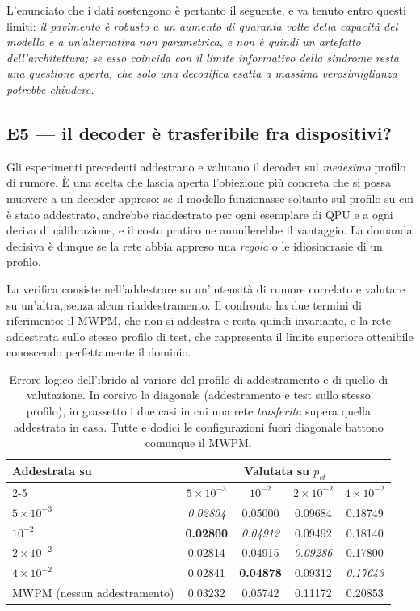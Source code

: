L'enunciato che i dati sostengono è pertanto il seguente, e va tenuto entro questi limiti: \emph{il pavimento è robusto a un aumento di quaranta volte della capacità del modello e a un'alternativa non parametrica, e non è quindi un artefatto dell'architettura; se esso coincida con il limite informativo della sindrome resta una questione aperta, che solo una decodifica esatta a massima verosimiglianza potrebbe chiudere.}

\subsection{E5 --- il decoder è trasferibile fra dispositivi?}
\label{subsec:neural_generalizzazione}

Gli esperimenti precedenti addestrano e valutano il decoder sul \emph{medesimo} profilo di rumore. È una scelta che lascia aperta l'obiezione più concreta che si possa muovere a un decoder appreso: se il modello funzionasse soltanto sul profilo su cui è stato addestrato, andrebbe riaddestrato per ogni esemplare di \ac{QPU} e a ogni deriva di calibrazione, e il costo pratico ne annullerebbe il vantaggio. La domanda decisiva è dunque se la rete abbia appreso una \emph{regola} o le idiosincrasie di un profilo.

La verifica consiste nell'addestrare su un'intensità di rumore correlato e valutare su un'altra, senza alcun riaddestramento. Il confronto ha due termini di riferimento: il \ac{MWPM}, che non si addestra e resta quindi invariante, e la rete addestrata sullo stesso profilo di test, che rappresenta il limite superiore ottenibile conoscendo perfettamente il dominio.

\begin{table}[H]
\centering
\small
\begin{tabular}{lcccc}
\toprule
\textbf{Addestrata su} & \multicolumn{4}{c}{\textbf{Valutata su} $p_{ct}$} \\
\cmidrule(lr){2-5}
 & $5\times10^{-3}$ & $10^{-2}$ & $2\times10^{-2}$ & $4\times10^{-2}$ \\
\midrule
$5\times10^{-3}$ & \textit{0.02804} & 0.05000 & 0.09684 & 0.18749 \\
$10^{-2}$        & \textbf{0.02800} & \textit{0.04912} & 0.09492 & 0.18140 \\
$2\times10^{-2}$ & 0.02814 & 0.04915 & \textit{0.09286} & 0.17800 \\
$4\times10^{-2}$ & 0.02841 & \textbf{0.04878} & 0.09312 & \textit{0.17643} \\
\midrule
\ac{MWPM} (nessun addestramento) & 0.03232 & 0.05742 & 0.11172 & 0.20853 \\
\bottomrule
\end{tabular}
\caption[Trasferibilità del decoder appreso fra profili di rumore]{Errore logico dell'ibrido al variare del profilo di addestramento e di quello di valutazione. In corsivo la diagonale (addestramento e test sullo stesso profilo), in grassetto i due casi in cui una rete \emph{trasferita} supera quella addestrata in casa. Tutte e dodici le configurazioni fuori diagonale battono comunque il \ac{MWPM}.}
\label{tab:neural_trasferimento}
\end{table}

